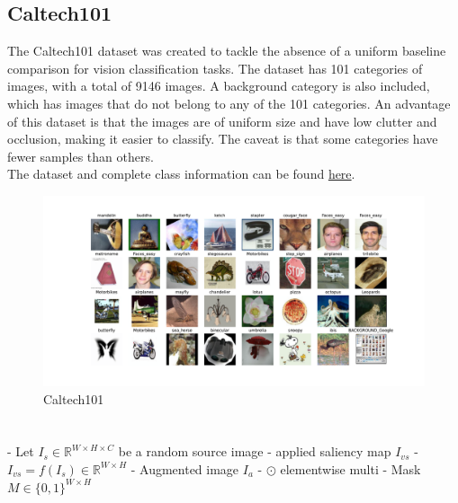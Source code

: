 \subsection{Caltech101}
The Caltech101 \cite{liCaltech101} dataset was created to tackle the absence of a uniform baseline comparison for vision classification tasks. The dataset has 101 categories of images, with a total of 9146 images. A background category is also included, which has images that do not belong to any of the 101 categories. An advantage of this dataset is that the images are of uniform size and have low clutter and occlusion, making it easier to classify. The caveat is that some categories have fewer samples than others.\\
The dataset and complete class information can be found \href{https://www.kaggle.com/datasets/862ae86edba271c39f76d0b530edeb55076b4b82b971160637210900747c44b1}{here}.
\begin{figure}[H]
    \centering
    \includegraphics[width=1\textwidth]{images/caltech101.pdf}
    \caption{Caltech101}
    \label{fig:calt}
\end{figure}

\section{}
- Let $I_{s} \in \mathbb{R}^{W \times H \times C}$ be a random source image
- applied saliency map $I_{vs}$ 
	- $I_{vs} = f(I_{s}) \in \mathbb{R}^{W \times H}$
	- Augmented image $I_{a}$
	- $\odot$ elementwise multi 
	- Mask $M \in \{0,1\}^{W \times H}$ 


